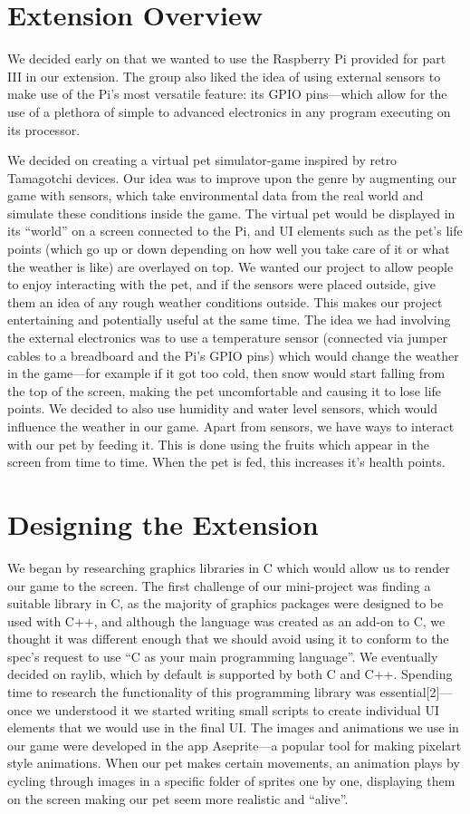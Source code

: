 \documentclass[11pt, oneside, UKenglish]{article}
\begin{document}
\section{Extension Overview}
We decided early on that we wanted to use the Raspberry Pi provided for part III in our extension.
The group also liked the idea of using external sensors to make use of the Pi's most versatile feature: its GPIO pins---which allow for the use of a plethora of simple to advanced electronics in any program executing on its processor.

We decided on creating a virtual pet simulator-game inspired by retro Tamagotchi devices.
Our idea was to improve upon the genre by augmenting our game with sensors, which take environmental data from the real world and simulate these conditions inside the game.
The virtual pet would be displayed in its \enquote{world} on a screen connected to the Pi, and UI elements such as the pet's life points (which go up or down depending on how well you take care of it or what the weather is like) are overlayed on top.
We wanted our project to allow people to enjoy interacting with the pet, and if the sensors were placed outside, give them an idea of any rough weather conditions outside.
This makes our project entertaining and potentially useful at the same time. 
The idea we had involving the external electronics was to use a temperature sensor (connected via jumper cables to a breadboard and the Pi's GPIO pins) which would change the weather in the game---for example if it got too cold, then snow would start falling from the top of the screen, making the pet uncomfortable and causing it to lose life points.
We decided to also use humidity and water level sensors, which would influence the weather in our game.
Apart from sensors, we have ways to interact with our pet by feeding it. 
This is done using the fruits which appear in the screen from time to time. 
When the pet is fed, this increases it's health points. 

\section{Designing the Extension}
We began by researching graphics libraries in C which would allow us to render our game to the screen.
The first challenge of our mini-project was finding a suitable library in C, as the majority of graphics packages were designed to be used with C++, and although the language was created as an add-on to C, we thought it was different enough that we should avoid using it to conform to the spec's request to use \enquote{C as your main programming language}.
We eventually decided on raylib, which by default is supported by both C and C++.
Spending time to research the functionality of this programming library was essential[2]---once we understood it we started writing small scripts to create individual UI elements that we would use in the final UI.
The images and animations we use in our game were developed in the app Aseprite---a popular tool for making pixelart style animations.
When our pet makes certain movements, an animation plays by cycling through images in a specific folder of sprites one by one, displaying them on the screen making our pet seem more realistic and \enquote{alive}. 
\end{document}

